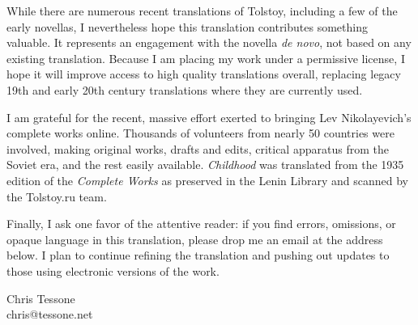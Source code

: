 While there are numerous recent translations of Tolstoy, including a few of the early novellas, I nevertheless hope this translation contributes something valuable. It represents an engagement with the novella \textit{de novo}, not based on any existing translation. Because I am placing my work under a permissive license, I hope it will improve access to high quality translations overall, replacing legacy 19th and early 20th century translations where they are currently used.

I am grateful for the recent, massive effort exerted to bringing Lev Nikolayevich's complete works online. Thousands of volunteers from nearly 50 countries were involved, making original works, drafts and edits, critical apparatus from the Soviet era, and the rest easily available. \textit{Childhood} was translated from the 1935 edition of the \textit{Complete Works} as preserved in the Lenin Library and scanned by the Tolstoy.ru team.

Finally, I ask one favor of the attentive reader: if you find errors, omissions, or opaque language in this translation, please drop me an email at the address below. I plan to continue refining the translation and pushing out updates to those using electronic versions of the work.

\begin{flushright}
Chris Tessone\\
chris@tessone.net
\end{flushright}
